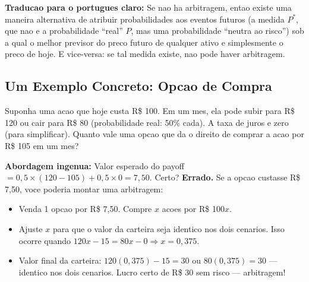 \documentclass[12pt,a4paper]{article}
\theoremstyle{remark}
\begin{document}
\begin{center}
\end{center}

\textbf{Traducao para o portugues claro:} Se nao ha arbitragem, entao existe uma
maneira alternativa de atribuir probabilidades aos eventos futuros (a medida
$P^*$, que nao e a probabilidade ``real'' $P$, mas uma probabilidade ``neutra ao
risco'') sob a qual o melhor previsor do preco futuro de qualquer ativo e
simplesmente o preco de hoje. E vice-versa: se tal medida existe, nao pode haver
arbitragem.

\subsection{Um Exemplo Concreto: Opcao de Compra}

Suponha uma acao que hoje custa R\$ 100. Em um mes, ela pode subir para R\$
120 ou cair para R\$ 80 (probabilidade real: 50\% cada). A taxa de juros e zero
(para simplificar). Quanto vale uma opcao que da o direito de comprar a acao por
R\$ 105 em um mes?

\textbf{Abordagem ingenua:} Valor esperado do payoff $= 0,5 \times (120-105) +
0,5 \times 0 = 7,50$. Certo? \textbf{Errado.} Se a opcao custasse R\$ 7,50,
voce poderia montar uma arbitragem:

\begin{itemize}[nosep]
  \item Venda 1 opcao por R\$ 7,50. Compre $x$ acoes por R\$ 100$x$.
  \item Ajuste $x$ para que o valor da carteira seja identico nos dois cenarios.
        Isso ocorre quando $120x - 15 = 80x - 0 \Rightarrow x = 0,375$.
  \item Valor final da carteira: $120(0,375) - 15 = 30$ ou $80(0,375) = 30$ —
        identico nos dois cenarios. Lucro certo de R\$ 30 sem risco — arbitragem!
\end{itemize}
\end{document}
